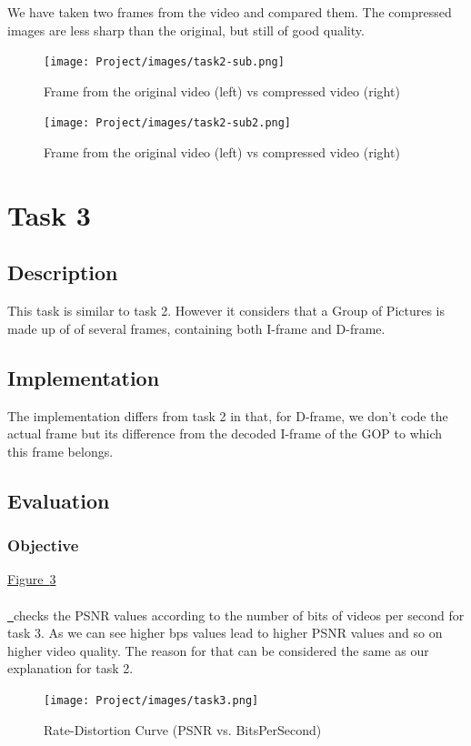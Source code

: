 \documentclass{article}
\newcommand*{\figref}[2][]{%
  \hyperref[{fig:#2}]{%
    Figure~\ref*{fig:#2}%
    \ifx\\#1\\%
    \else
      \,#1%
    \fi
  }%
}
\begin{document}
We have taken two frames from the video and compared them. The compressed images are less sharp than the original, but still of good quality.

\begin{figure}[H]
  \centering
  \texttt{[image: Project/images/task2-sub.png]}
  \caption{Frame from the original video (left) vs compressed video (right)}
  \label{fig:task2-sub}
\end{figure}

\begin{figure}[H]
  \centering
  \texttt{[image: Project/images/task2-sub2.png]}
  \caption{Frame from the original video (left) vs compressed video (right)}
  \label{fig:task2-sub2}
\end{figure}

\section{Task 3}
\subsection{Description}

This task is similar to task 2. However it considers that a Group of Pictures is made up of of several frames, containing both I-frame and D-frame.

\subsection{Implementation}

The implementation differs from task 2 in that, for D-frame, we don't code the actual frame but its difference from the decoded I-frame of the GOP to which this frame belongs.


\subsection{Evaluation}
\subsubsection{Objective}

\figref{task3} checks the PSNR values according to the number of bits of videos per second for task 3. As we can see higher bps values lead to higher PSNR values and so on higher video quality. The reason for that can be considered the same as our explanation for task 2.

\begin{figure}[H]
  \centering
  \texttt{[image: Project/images/task3.png]}
  \caption{Rate-Distortion Curve (PSNR vs. BitsPerSecond)}
  \label{fig:task3}
\end{figure}
\end{document}

